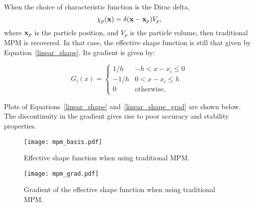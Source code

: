 When the choice of characteristic function is the Dirac delta,
\begin{equation}
\chi_p(\bfx) = \delta(\bfx-\bfx_p)V_p , \label{MPM_char}
\end{equation}
where $\bfx_p$ is the particle position, and $V_p$ is the particle volume,
then traditional MPM is recovered.  In that case, the effective shape function
is still that given by Equation~\ref{linear_shape}.  Its gradient is given by:

\begin{equation}
G_i\left(x\right) = \begin{cases} {1 / h} & {-h < x-x_i \le 0} \\
                    {-1 / h} & {0  < x-x_i \le h} \\
                    0 & \text{otherwise},
       \end{cases}
\label{linear_shape_grad}
\end{equation}

Plots of Equations~\ref{linear_shape} and~\ref{linear_shape_grad} are shown
below.  The discontinuity in the gradient gives rise to poor accuracy and
stability properties.

\begin{figure}
  \texttt{[image: mpm\_basis.pdf]}
  \caption{Effective shape function when using traditional MPM.}
  \label{Fig:MPMShape}
\end{figure}

\begin{figure}
  \texttt{[image: mpm\_grad.pdf]}
  \caption{Gradient of the effective shape function when using traditional MPM.}
  \label{Fig:MPMShapeGrad}
\end{figure}


